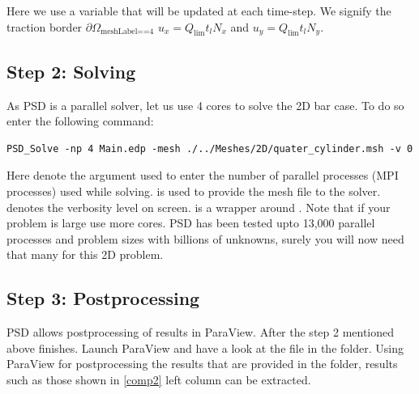 Here we use a variable  that will be updated at each time-step.
We signify the traction border \(\partial\Omega_{\text{meshLabel==4}}\)
\(u_x=Q_{\text{lim}}t_lN_x\) and \(u_y=Q_{\text{lim}}t_lN_y\).

\subsection{Step 2: Solving}

As PSD is a parallel solver, let us use 4 cores to solve the 2D bar
case. To do so enter the following command:

\begin{lstlisting}[style=BashInputStyle]
PSD_Solve -np 4 Main.edp -mesh ./../Meshes/2D/quater_cylinder.msh -v 0
\end{lstlisting}

Here  denote the argument used to enter the number of
parallel processes (MPI processes) used while solving.
 is used to provide the
mesh file to the solver.  denotes the verbosity level on
screen.  is a wrapper around . Note
that if your problem is large use more cores. PSD has been tested upto
13,000 parallel processes and problem sizes with billions of unknowns,
surely you will now need that many for this 2D problem.

\subsection{Step 3: Postprocessing}

PSD allows postprocessing of results in ParaView. After the step 2
mentioned above finishes. Launch ParaView and have a look at the
 file in the  folder. Using ParaView for
postprocessing the results that are provided in the 
folder, results such as those shown in \cref{comp2} left column can be
extracted.

